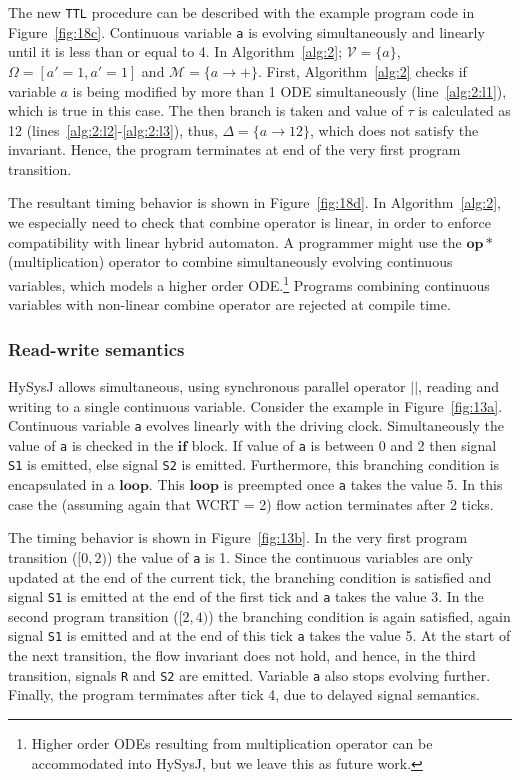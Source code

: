 \documentclass[10pt,journal,cspaper,compsoc]{IEEEtran}
\begin{document}
The new \texttt{TTL} procedure can be described with the example program
code in Figure~\ref{fig:18c}. Continuous variable \texttt{a} is evolving
simultaneously and linearly until it is less than or equal to 4. In
Algorithm~\ref{alg:2}; $\mathcal{V} = \{a\}$, $\Omega = [a'=1, a'=1]$
and $\mathcal{M} = \{a \rightarrow +\}$. First, Algorithm~\ref{alg:2}
checks if variable $a$ is being modified by more than 1 ODE
simultaneously (line~\ref{alg:2:l1}), which is true in this case. The
then branch is taken and value of $\tau$ is calculated as 12
(lines~\ref{alg:2:l2}-\ref{alg:2:l3}), thus, $\Delta = \{a \rightarrow
12\}$, which does not satisfy the invariant. Hence, the program
terminates at end of the very first program transition.



The resultant timing behavior is shown in Figure~\ref{fig:18d}. In
Algorithm~\ref{alg:2}, we especially need to check that combine operator
is linear, in order to enforce compatibility with linear hybrid
automaton. A programmer might use the $\mathbf{op*}$ (multiplication)
operator to combine simultaneously evolving continuous variables, which
models a higher order ODE.\footnote{Higher order ODEs resulting from
  multiplication operator can be accommodated into HySysJ, but we leave
  this as future work.} Programs combining continuous variables with
non-linear combine operator are rejected at compile time.

\subsubsection{Read-write semantics}
\label{sec:read-write-semantics}

HySysJ allows simultaneous, using synchronous parallel operator $||$,
reading and writing to a single continuous variable. Consider the
example in Figure~\ref{fig:13a}. Continuous variable \texttt{a} evolves
linearly with the driving clock. Simultaneously the value of \texttt{a}
is checked in the $\mathbf{if}$ block. If value of \texttt{a} is between
0 and 2 then signal \texttt{S1} is emitted, else signal \texttt{S2} is
emitted. Furthermore, this branching condition is encapsulated in a
$\mathbf{loop}$. This $\mathbf{loop}$ is preempted once \texttt{a} takes
the value 5. In this case the (assuming again that WCRT = 2) flow action
terminates after 2 ticks.

The timing behavior is shown in Figure~\ref{fig:13b}. In the very first
program transition ($[0,2)$) the value of \texttt{a} is 1. Since the
continuous variables are only updated at the end of the current tick,
the branching condition is satisfied and signal \texttt{S1} is emitted
at the end of the first tick and \texttt{a} takes the value 3. In the
second program transition ($[2,4)$) the branching condition is again
satisfied, again signal \texttt{S1} is emitted and at the end of this
tick \texttt{a} takes the value 5. At the start of the next transition,
the flow invariant does not hold, and hence, in the third transition,
signals \texttt{R} and \texttt{S2} are emitted. Variable \texttt{a} also
stops evolving further. Finally, the program terminates after tick 4,
due to delayed signal semantics.
\end{document}
